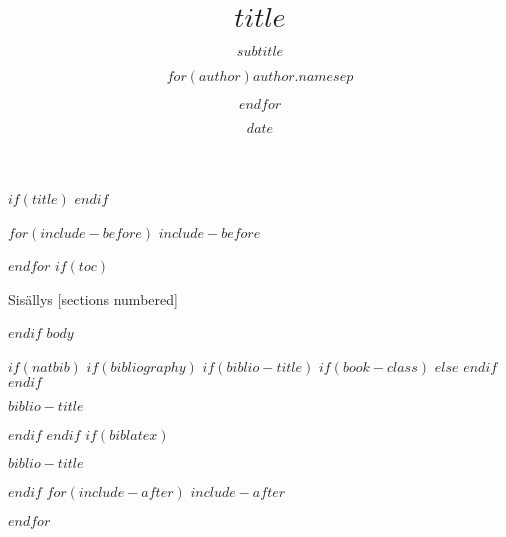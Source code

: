 \documentclass[$if(fontsize)$$fontsize$,$endif$$if(handout)$handout,$endif$$if(beamer)$ignorenonframetext,$endif$$for(classoption)$$classoption$$sep$,$endfor$]{$documentclass$}
\title{$title$}
\subtitle{$subtitle$}
\institute{$institute$}
\author{$for(author)$$author.name$$sep$ \and $endfor$}
\date{$date$}
\begin{document}
$if(title)$
\frame{\titlepage}
$endif$



$for(include-before)$
$include-before$

$endfor$
$if(toc)$
\begin{frame}{Sisällys}
  [sections numbered]
  \tableofcontents
\end{frame}

$endif$
$body$

$if(natbib)$
$if(bibliography)$
$if(biblio-title)$
$if(book-class)$
\renewcommand\bibname{$biblio-title$}
$else$
\renewcommand\refname{$biblio-title$}
$endif$
$endif$
\begin{frame}[allowframebreaks]{$biblio-title$}

\end{frame}

$endif$
$endif$
$if(biblatex)$
\begin{frame}[allowframebreaks]{$biblio-title$}
\printbibliography[heading=none]
\end{frame}

$endif$
$for(include-after)$
$include-after$

$endfor$
\end{document}
